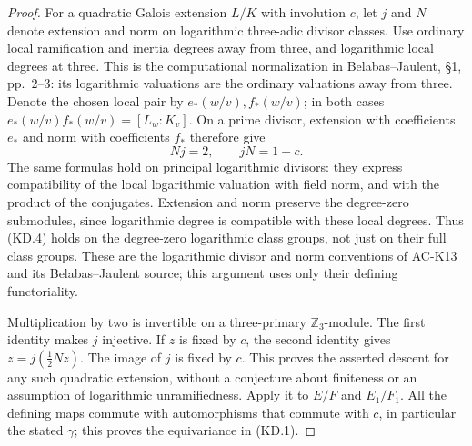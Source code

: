 \begin{proof}
For a quadratic Galois extension $L/K$ with involution $c$,
let $j$ and $N$ denote extension and norm on logarithmic
three-adic divisor classes.  Use ordinary local ramification and inertia degrees away
from three, and logarithmic local degrees at three.
This is the computational normalization in Belabas--Jaulent,
\S1, pp.~2--3: its logarithmic valuations are the ordinary
valuations away from three.  Denote the chosen local pair
by $e_*(w/v),f_*(w/v)$; in both cases
$e_*(w/v)f_*(w/v)=[L_w:K_v]$.
On a prime divisor, extension with coefficients $e_*$
and norm with coefficients $f_*$ therefore give
\[
                      Nj=2,\qquad jN=1+c.             \tag{KD.4}
\]
The same formulas hold on principal logarithmic divisors:
they express compatibility of the local logarithmic
valuation with field norm, and with the product of the
conjugates.  Extension and norm preserve the degree-zero
submodules, since logarithmic degree is compatible with
these local degrees.  Thus (KD.4) holds on the degree-zero
logarithmic class groups, not just on their full class groups.
These are the logarithmic divisor and norm conventions of
AC-K13 and its Belabas--Jaulent source; this argument uses
only their defining functoriality.

Multiplication by two is invertible on a three-primary
$\mathbb Z_3$-module.  The first identity makes $j$ injective.
If $z$ is fixed by $c$, the second identity gives
$z=j(\tfrac12 Nz)$.  The image of $j$ is fixed by $c$.
This proves the asserted descent for any such quadratic
extension, without a conjecture about finiteness or an
assumption of logarithmic unramifiedness.
Apply it to $E/F$ and $E_1/F_1$.
All the defining maps commute with automorphisms that
commute with $c$, in particular the stated $\gamma$;
this proves the equivariance in (KD.1).


\end{proof}
